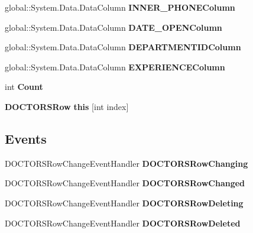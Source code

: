 \begin{CompactItemize}
\item 
global::System.Data.DataColumn \textbf{INNER\_\-PHONEColumn}\hspace{0.3cm}{\tt  [get]}\label{class_automatic_medical_system_1_1_data_set2_1_1_d_o_c_t_o_r_s_data_table_8d154baccccb36e506430475931b05b5}

\item 
global::System.Data.DataColumn \textbf{DATE\_\-OPENColumn}\hspace{0.3cm}{\tt  [get]}\label{class_automatic_medical_system_1_1_data_set2_1_1_d_o_c_t_o_r_s_data_table_f86d4225a82ffd617a0b59b8d9547e5b}

\item 
global::System.Data.DataColumn \textbf{DEPARTMENTIDColumn}\hspace{0.3cm}{\tt  [get]}\label{class_automatic_medical_system_1_1_data_set2_1_1_d_o_c_t_o_r_s_data_table_93e91e18d8e8f734a7ac8cccac00b061}

\item 
global::System.Data.DataColumn \textbf{EXPERIENCEColumn}\hspace{0.3cm}{\tt  [get]}\label{class_automatic_medical_system_1_1_data_set2_1_1_d_o_c_t_o_r_s_data_table_16c3439d6154e7a5fa7eacf74de4f823}

\item 
int \textbf{Count}\hspace{0.3cm}{\tt  [get]}\label{class_automatic_medical_system_1_1_data_set2_1_1_d_o_c_t_o_r_s_data_table_5a646027476a5b360b39edee89be0244}

\item 
{\bf DOCTORSRow} \textbf{this} [int index]\hspace{0.3cm}{\tt  [get]}\label{class_automatic_medical_system_1_1_data_set2_1_1_d_o_c_t_o_r_s_data_table_f722774ac013c3d5a7174d9a35ab94fd}

\end{CompactItemize}
\subsection*{Events}
\begin{CompactItemize}
\item 
DOCTORSRowChangeEventHandler \textbf{DOCTORSRowChanging}\label{class_automatic_medical_system_1_1_data_set2_1_1_d_o_c_t_o_r_s_data_table_ac1343a5415bd5313659a5766cdbdbf0}

\item 
DOCTORSRowChangeEventHandler \textbf{DOCTORSRowChanged}\label{class_automatic_medical_system_1_1_data_set2_1_1_d_o_c_t_o_r_s_data_table_6fff6c66a502e749f1b8856383a1b13b}

\item 
DOCTORSRowChangeEventHandler \textbf{DOCTORSRowDeleting}\label{class_automatic_medical_system_1_1_data_set2_1_1_d_o_c_t_o_r_s_data_table_27fe98595ad639e40883a0f05d22c0db}

\item 
DOCTORSRowChangeEventHandler \textbf{DOCTORSRowDeleted}\label{class_automatic_medical_system_1_1_data_set2_1_1_d_o_c_t_o_r_s_data_table_dbb4cafe202427c086840f917ea0e3d8}

\end{CompactItemize}


